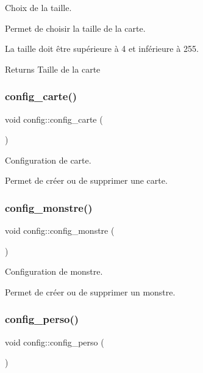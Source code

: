 Choix de la taille. 

Permet de choisir la taille de la carte.

La taille doit être supérieure à 4 et inférieure à 255. \begin{DoxyReturn}{Returns}
Taille de la carte 
\end{DoxyReturn}
\mbox{\label{classconfig_a346b395fb2b184ce5df6e016373573cf}} 
\subsubsection{\texorpdfstring{config\+\_\+carte()}{config\_carte()}}
{\footnotesize\ttfamily void config\+::config\+\_\+carte (\begin{DoxyParamCaption}{ }\end{DoxyParamCaption})}



Configuration de carte. 

Permet de créer ou de supprimer une carte. \mbox{\label{classconfig_ac7075cb352a6843ae07b907a40d2a8eb}} 
\subsubsection{\texorpdfstring{config\+\_\+monstre()}{config\_monstre()}}
{\footnotesize\ttfamily void config\+::config\+\_\+monstre (\begin{DoxyParamCaption}{ }\end{DoxyParamCaption})}



Configuration de monstre. 

Permet de créer ou de supprimer un monstre. \mbox{\label{classconfig_a4b425e40339f3e57e41b38677ec4cc5a}} 
\subsubsection{\texorpdfstring{config\+\_\+perso()}{config\_perso()}}
{\footnotesize\ttfamily void config\+::config\+\_\+perso (\begin{DoxyParamCaption}{ }\end{DoxyParamCaption})}



